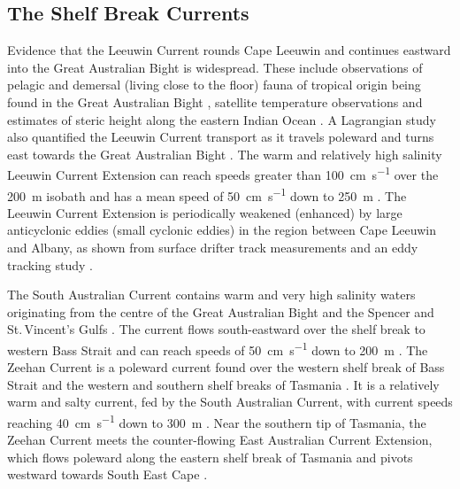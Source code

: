 \documentclass[preprint,3p,review,12pt]{elsarticle}
\begin{document}
\subsection{The Shelf Break Currents} \label{The Shelf Break Currents}
Evidence that the Leeuwin Current rounds Cape Leeuwin and continues eastward into the Great Australian Bight is widespread. These include observations of pelagic and demersal (living close to the floor) fauna of tropical origin being found in the Great Australian Bight \citep{Garrey1981}, satellite temperature observations \citep{Legeckis1981} and estimates of steric height along the eastern Indian Ocean \citep{Godfrey1985}. A Lagrangian study also quantified the Leeuwin Current transport as it travels poleward and turns east towards the Great Australian Bight \citep{YitSenBull2016}. The warm and relatively high salinity Leeuwin Current Extension can reach speeds greater than \SI{100}{\centi\meter\per\second} over the \SI{200}{\meter} isobath \citep{Cresswell1993} and has a mean speed of \SI{50}{\centi\meter\per\second} down to \SI{250}{\meter} \citep{Cresswell2004}. The Leeuwin Current Extension is periodically weakened (enhanced) by large anticyclonic eddies (small cyclonic eddies) in the region between Cape Leeuwin and Albany, as shown from surface drifter track measurements \citep{Godfrey1986} and an eddy tracking study \citep{Cresswell2004}.

The South Australian Current contains warm and very high salinity waters originating from the centre of the Great Australian Bight \citep{Rochford1986} and the Spencer and St.\,Vincent's Gulfs \citep{Godfrey1986}. The current flows south-eastward over the shelf break to western Bass Strait \citep{Ridgway2004} and can reach speeds of \SI{50}{\centi\meter\per\second} down to \SI{200}{\meter} \citep{Middleton2007}. The Zeehan Current is a poleward current found over the western shelf break of Bass Strait and the western and southern shelf breaks of Tasmania  \citep{Baines1983,Thompson1983}. It is a relatively warm and salty current, fed by the South Australian Current, with current speeds reaching \SI{40}{\centi\meter\per\second} down to \SI{300}{\meter} \citep{Ridgway2007}. Near the southern tip of Tasmania, the Zeehan Current meets the counter-flowing East Australian Current Extension, which flows poleward along the eastern shelf break of Tasmania and pivots westward towards South East Cape \citep{Cresswell2000,Oliver2016}.
\end{document}
